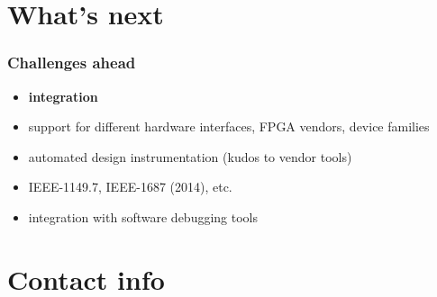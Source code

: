 \section{What's next}

\begin{frame}
\frametitle{Challenges ahead}
\begin{itemize}
  \item \textbf{integration}
  \item support for different hardware interfaces, FPGA vendors,
  device families
  \item automated design instrumentation (kudos to vendor tools)
  \item IEEE-1149.7, IEEE-1687 (2014), etc.
  \item integration with software debugging tools
\end{itemize}
\end{frame}

\section{Contact info}



